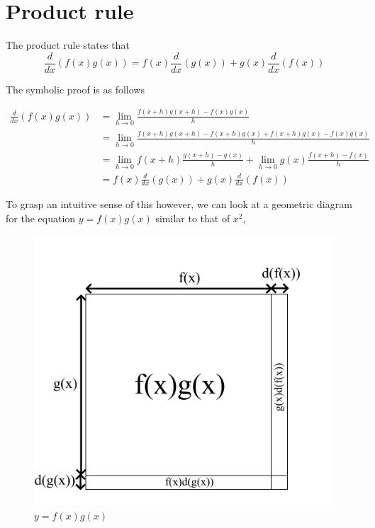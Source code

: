 \documentclass[a4paper,12pt,oneside]{book}
\begin{document}
\section{Product rule}

The product rule states that
$$\frac{d}{dx}(f(x)g(x))=f(x)\frac{d}{dx}(g(x))+g(x)\frac{d}{dx}(f(x))$$

\noindent The symbolic proof is as follows

$$
\begin{aligned}
\frac{d}{dx}(f(x)g(x))&=\lim_{h\to 0}\frac{f(x+h)g(x+h)-f(x)g(x)}{h}\\
&=\lim_{h\to 0}\frac{{f({x+h})g({x+h})-f({x+h})g(x)+f({x+h})g(x)-f(x)g(x)}}{h}\\
&=\lim_{h\to 0}f(x+h)\frac{g(x+h)-g(x)}{h}+\lim_{h\to 0}g(x)\frac{f(x+h)-f(x)}{h}\\
&=f(x)\frac{d}{dx}(g(x))+g(x)\frac{d}{dx}(f(x))
\end{aligned}
$$

\noindent To grasp an intuitive sense of this however, we can look at a geometric diagram for the equation $y=f(x)g(x)$ similar to that of $x^2$,

\begin{figure}[H]
    \begin{center}
        \includegraphics[scale=0.35]{img/zayan/prodrule.png}
        \caption{$y=f(x)g(x)$}
        \label{fig:prodrule}
    \end{center}
\end{figure}
\end{document}
